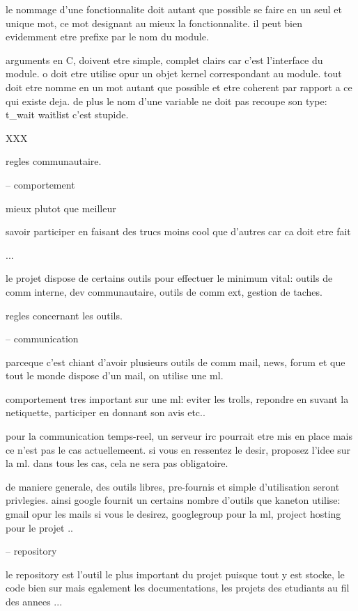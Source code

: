 {le nommage d'une fonctionnalite doit autant que possible se faire en un
seul et unique mot, ce mot designant au mieux la fonctionnalite. il peut bien
evidemment etre prefixe par le nom du module.

arguments en C, doivent etre simple, complet clairs car c'est l'interface
du module. o doit etre utilise opur un objet kernel correspondant au module.
tout doit etre nomme en un mot autant que possible et etre coherent par
rapport a ce qui existe deja. de plus le nom d'une variable ne doit
pas recoupe son type: t_wait waitlist c'est stupide.

XXX

%
%

regles communautaire.

-- comportement

mieux plutot que meilleur

savoir participer en faisant des trucs moins cool que d'autres car ca
doit etre fait

...

le projet dispose de certains outils pour effectuer le minimum vital:
outils de comm interne, dev communautaire, outils de comm ext, gestion
de taches.

%
%

regles concernant les outils.

-- communication

parceque c'est chiant d'avoir plusieurs outils de comm mail, news, forum
et que tout le monde dispose d'un mail, on utilise une ml.

comportement tres important sur une ml: eviter les trolls, repondre
en suvant la netiquette, participer en donnant son avis etc..

pour la communication temps-reel, un serveur irc pourrait etre mis en
place mais ce n'est pas le cas actuellemeent. si vous en ressentez le
desir, proposez l'idee sur la ml. dans tous les cas, cela ne sera pas
obligatoire.

de maniere generale, des outils libres, pre-fournis et simple d'utilisation
seront privlegies. ainsi google fournit un certains nombre d'outils que
kaneton utilise: gmail opur les mails si vous le desirez, googlegroup pour
la ml, project hosting pour le projet ..

-- repository

le repository est l'outil le plus important du projet puisque tout y
est stocke, le code bien sur mais egalement les documentations, les
projets des etudiants au fil des annees ...

}
